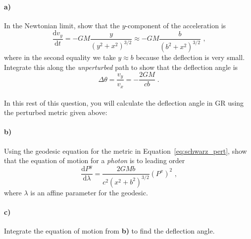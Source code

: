 \documentclass[12pt]{article}
\newcommand\diff{\mathrm{d}}
\begin{document}
\paragraph{a)} In the Newtonian limit, show that the $y$-component of the acceleration is
\begin{equation}
    \frac{\diff v_y}{\diff t} = - G M \frac{y}{\left(y^2 + x^2\right)^{3/2}}
    \approx - G M \frac{b}{\left(b^2 + x^2\right)^{3/2}} \text{ ,}
\end{equation}
where in the second equality we take $y \approx b$ because the deflection is
very small.
Integrate this along the \emph{unperturbed} path to show that the deflection angle is
\begin{equation}
    \Delta \theta = \frac{v_y}{v_x} = - \frac{2 G M}{cb} \; .
\end{equation} \\[10pt]
In this rest of this question, you will calculate the deflection angle in GR using the
perturbed metric given above:

\paragraph{b)} Using the geodesic equation for the metric in
Equation~\ref{eq:schwarz_pert}, show that the equation of motion for a \emph{photon} is to leading order
\begin{equation}
    \frac{\diff P^y}{\diff \lambda}
    = \frac{2 G M b}{c^2 \left(x^2 + b^2\right)^{3/2}} (P^x)^2 \text{ ,}
\end{equation}
where $\lambda$ is an affine parameter for the geodesic.

\paragraph{c)} Integrate the equation of motion from \textbf{b)} to find the
deflection angle.
\end{document}

